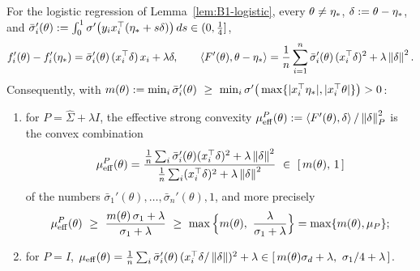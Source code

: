 \begin{proposition}\label{prop:B1-traj-sc}
For the logistic regression of Lemma~\ref{lem:B1-logistic}, every $\theta\ne\eta_\ast$, $\delta:=\theta-\eta_\ast$, and
$\bar\sigma_i'(\theta):=\int_0^1\sigma'\big(y_ix_i^\top(\eta_\ast+s\delta)\big)\,ds\in(0,\tfrac14]$,
\begin{equation}\label{eq:B1-pairing-exact}
f'_i(\theta)-f'_i(\eta_\ast)=\bar\sigma_i'(\theta)\,(x_i^\top\delta)\,x_i+\lambda\delta,\qquad
\left\langle F'(\theta), \theta-\eta_\ast \right\rangle=\frac1n\sum_{i=1}^n\bar\sigma_i'(\theta)\,(x_i^\top\delta)^2+\lambda\left\|\delta\right\|^2 .
\end{equation}
Consequently, with
$m(\theta):=\min_i\bar\sigma_i'(\theta)\ \ge\ \min_i\sigma'\big(\max\{|x_i^\top\etastar|,|x_i^\top\theta|\}\big)>0$:
\begin{enumerate}[label=(\roman*)]
\item for $P=\hat\Sigma+\lambda I$, the effective strong convexity
$\mu_{\mathrm{eff}}^P(\theta):=\left\langle F'(\theta), \delta \right\rangle/\left\|\delta\right\|_P^2$ is the convex combination
\begin{equation}\label{eq:B1-muEff-stat}
\muEff^P(\theta)=\frac{\frac1n\sum_i\bar\sigma_i'(\theta)(x_i^\top\delta)^2+\lambda\norm{\delta}^2}
{\frac1n\sum_i(x_i^\top\delta)^2+\lambda\norm{\delta}^2}\ \in\ [\,m(\theta),\,1\,]
\end{equation}
of the numbers $\bar\sigma_1'(\theta),\dots,\bar\sigma_n'(\theta),1$, and more precisely
\begin{equation}\label{ineq:P-trajsc}
\muEff^P(\theta)\ \ge\ \frac{m(\theta)\,\sigma_1+\lambda}{\sigma_1+\lambda}
\ \ge\ \max\Big\{m(\theta),\ \frac{\lambda}{\sigma_1+\lambda}\Big\}=\max\{m(\theta),\mu_P\};
\end{equation}
\item for $P=I$,
$\muEff(\theta)=\frac1n\sum_i\bar\sigma_i'(\theta)\,(x_i^\top\delta/\norm{\delta})^2+\lambda
\in[\,m(\theta)\sigma_d+\lambda,\ \sigma_1/4+\lambda\,]$.
\end{enumerate}
\end{proposition}
